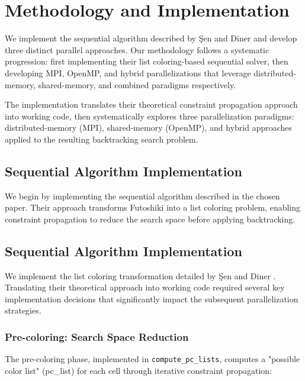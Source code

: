 \section{Methodology and Implementation}
\label{sec:solution}

We implement the sequential algorithm described by Şen and Diner \cite{Sen2024Futoshiki} and develop three distinct parallel approaches. Our methodology follows a systematic progression: first implementing their list coloring-based sequential solver, then developing MPI, OpenMP, and hybrid parallelizations that leverage distributed-memory, shared-memory, and combined paradigms respectively.

The implementation translates their theoretical constraint propagation approach into working code, then systematically explores three parallelization paradigms: distributed-memory (MPI), shared-memory (OpenMP), and hybrid approaches applied to the resulting backtracking search problem.

\subsection{Sequential Algorithm Implementation}
\label{subsec:paper_implementation}
We begin by implementing the sequential algorithm described in the chosen paper. Their approach transforms Futoshiki into a list coloring problem, enabling constraint propagation to reduce the search space before applying backtracking.

\subsection{Sequential Algorithm Implementation}
\label{subsec:paper_implementation}
We implement the list coloring transformation detailed by Şen and Diner \cite{Sen2024Futoshiki}. Translating their theoretical approach into working code required several key implementation decisions that significantly impact the subsequent parallelization strategies.

\subsubsection{Pre-coloring: Search Space Reduction}
\label{subsubsec:precoloring}
The pre-coloring phase, implemented in \texttt{compute\_pc\_lists}, computes a "possible color list" (pc\_list) for each cell through iterative constraint propagation:

